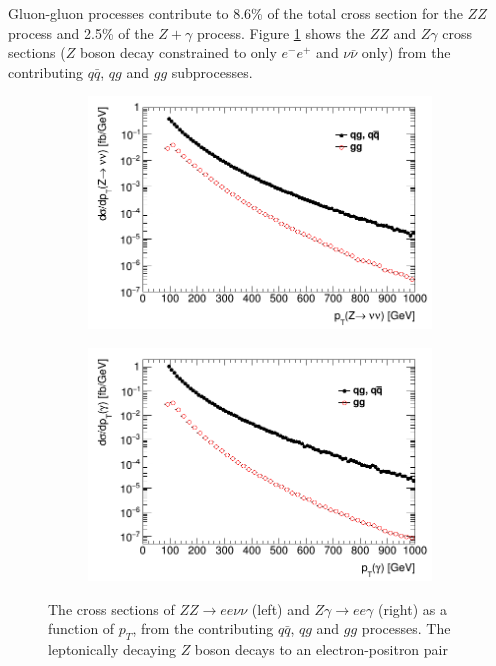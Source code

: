 \documentclass[11pt,a4paper,openright,twoside]{report}
\begin{document}
Gluon-gluon processes contribute to 8.6\% of the total cross section for the $ZZ$ process and 2.5\% of the $Z+\gamma$ process. Figure \ref{fig:xsec_gg_qq} shows the $ZZ$ and $Z\gamma$ cross sections ($Z$ boson decay constrained to only $e^-e^+$ and $\nu\bar{\nu}$ only) from the contributing $q\bar{q}$, $qg$ and $gg$ subprocesses.
\begin{figure}[H]
\centering
	\begin{subfigure}{0.49\textwidth}
		\includegraphics[width=\linewidth]{ZZ_subproc.png}
	\end{subfigure}
	\begin{subfigure}{0.49\textwidth}
		\includegraphics[width=\linewidth]{Zg_subproc.png}
	\end{subfigure}	
\caption{The cross sections of $ZZ\to ee\nu\nu$ (left) and $Z\gamma\to ee\gamma$ (right) as a function of $p_T$, from the contributing $q\bar{q}$, $qg$ and $gg$ processes. The leptonically decaying $Z$ boson decays to an electron-positron pair}
\label{fig:xsec_gg_qq}
\end{figure}
\end{document}
